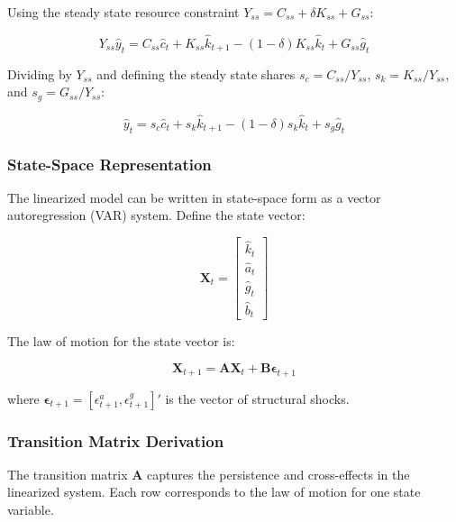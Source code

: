 \documentclass[5p,authoryear]{elsarticle}
\begin{document}
Using the steady state resource constraint $Y_{ss} = C_{ss} + \delta K_{ss} + G_{ss}$:

\begin{equation}
Y_{ss} \hat{y}_t = C_{ss} \hat{c}_t + K_{ss} \hat{k}_{t+1} - (1-\delta) K_{ss} \hat{k}_t + G_{ss} \hat{g}_t
\label{eq:resource_linear_intermediate}
\end{equation}

Dividing by $Y_{ss}$ and defining the steady state shares $s_c = C_{ss}/Y_{ss}$, $s_k = K_{ss}/Y_{ss}$, and $s_g = G_{ss}/Y_{ss}$:

\begin{equation}
\hat{y}_t = s_c \hat{c}_t + s_k \hat{k}_{t+1} - (1-\delta) s_k \hat{k}_t + s_g \hat{g}_t
\label{eq:linearized_resource}
\end{equation}

\subsubsection{State-Space Representation}

The linearized model can be written in state-space form as a vector autoregression (VAR) system. Define the state vector:

\begin{equation}
\mathbf{X}_t = \begin{bmatrix} \hat{k}_t \\ \hat{a}_t \\ \hat{g}_t \\ \hat{b}_t \end{bmatrix}
\label{eq:state_vector}
\end{equation}

The law of motion for the state vector is:

\begin{equation}
\mathbf{X}_{t+1} = \mathbf{A} \mathbf{X}_t + \mathbf{B} \boldsymbol{\epsilon}_{t+1}
\label{eq:state_space}
\end{equation}

where $\boldsymbol{\epsilon}_{t+1} = [\epsilon_{t+1}^a, \epsilon_{t+1}^g]'$ is the vector of structural shocks.

\subsubsection{Transition Matrix Derivation}

The transition matrix $\mathbf{A}$ captures the persistence and cross-effects in the linearized system. Each row corresponds to the law of motion for one state variable.
\end{document}
